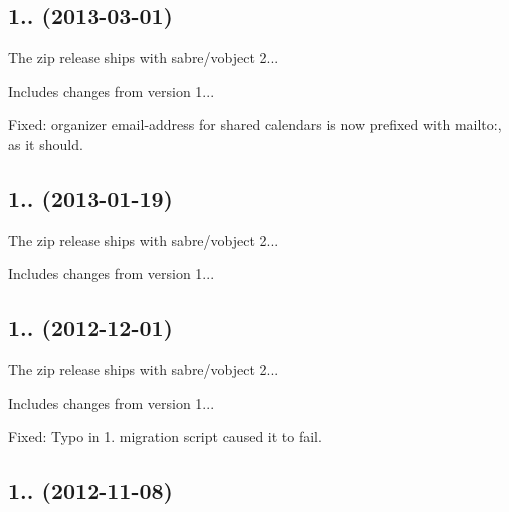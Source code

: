 \subsection*{1.. (2013-\/03-\/01) }


\begin{DoxyItemize}
\item The zip release ships with sabre/vobject 2...
\item Includes changes from version 1...
\item Fixed\+: organizer email-\/address for shared calendars is now prefixed with mailto\+:, as it should.
\end{DoxyItemize}

\subsection*{1.. (2013-\/01-\/19) }


\begin{DoxyItemize}
\item The zip release ships with sabre/vobject 2...
\item Includes changes from version 1...
\end{DoxyItemize}

\subsection*{1.. (2012-\/12-\/01) }


\begin{DoxyItemize}
\item The zip release ships with sabre/vobject 2...
\item Includes changes from version 1...
\item Fixed\+: Typo in 1. migration script caused it to fail.
\end{DoxyItemize}

\subsection*{1.. (2012-\/11-\/08) }


